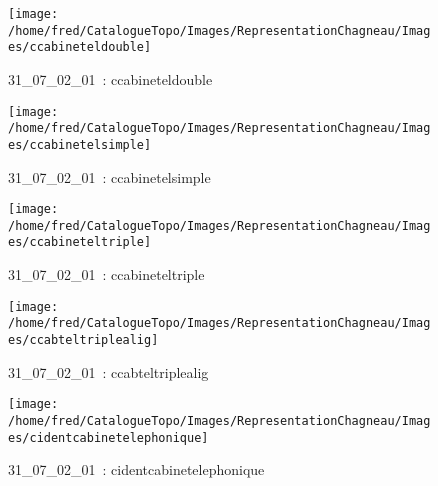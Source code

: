 \documentclass[12pt,titlepage]{book}
\begin{document}
\begin{figure}[h!]
  \begin{minipage}[t]{3cm}
    \begin{center}
      \texttt{[image: /home/fred/CatalogueTopo/Images/RepresentationChagneau/Images/ccabineteldouble]}
      \caption[~31\_07\_02\_01]{\small{31\_07\_02\_01~:} \tiny{ccabineteldouble}}\label{ccabineteldouble}
    \end{center}
  \end{minipage}
  \begin{minipage}[t]{3cm}
    \begin{center}
      \texttt{[image: /home/fred/CatalogueTopo/Images/RepresentationChagneau/Images/ccabinetelsimple]}
      \caption[~31\_07\_02\_01]{\small{31\_07\_02\_01~:} \tiny{ccabinetelsimple}}\label{ccabinetelsimple}
    \end{center}
  \end{minipage}
  \begin{minipage}[t]{3cm}
    \begin{center}
      \texttt{[image: /home/fred/CatalogueTopo/Images/RepresentationChagneau/Images/ccabineteltriple]}
      \caption[~31\_07\_02\_01]{\small{31\_07\_02\_01~:} \tiny{ccabineteltriple}}\label{ccabineteltriple}
    \end{center}
  \end{minipage}
  \begin{minipage}[t]{3cm}
    \begin{center}
      \texttt{[image: /home/fred/CatalogueTopo/Images/RepresentationChagneau/Images/ccabteltriplealig]}
      \caption[~31\_07\_02\_01]{\small{31\_07\_02\_01~:} \tiny{ccabteltriplealig}}\label{ccabteltriplealig}
    \end{center}
  \end{minipage}
  \begin{minipage}[t]{3cm}
    \begin{center}
      \texttt{[image: /home/fred/CatalogueTopo/Images/RepresentationChagneau/Images/cidentcabinetelephonique]}
      \caption[~31\_07\_02\_01]{\small{31\_07\_02\_01~:} \tiny{cidentcabinetelephonique}}\label{cidentcabinetelephonique}
    \end{center}
  \end{minipage}
\end{figure}
\end{document}
